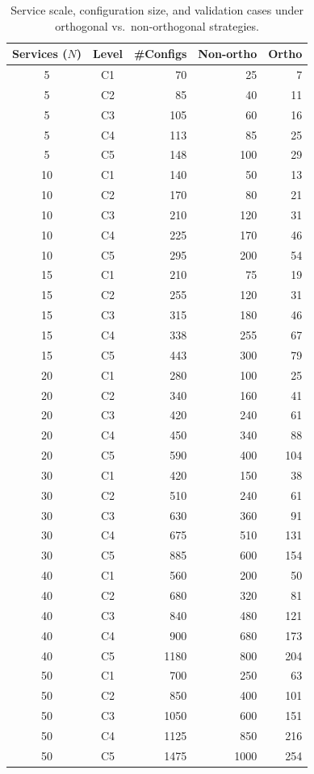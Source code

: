 \begin{table}[t]
\centering
\caption{Service scale, configuration size, and validation cases under orthogonal vs.\ non-orthogonal strategies.}
\label{tab:ortho-case-coverage}
\scriptsize
\setlength{\tabcolsep}{4pt}
\begin{tabular}{c c r r r}
\toprule
Services ($N$) & Level & \#Configs & Non-ortho & Ortho \\
\midrule
5 & C1 & 70 & 25 & 7 \\
5 & C2 & 85 & 40 & 11 \\
5 & C3 & 105 & 60 & 16 \\
5 & C4 & 113 & 85 & 25 \\
5 & C5 & 148 & 100 & 29 \\
\midrule
10 & C1 & 140 & 50 & 13 \\
10 & C2 & 170 & 80 & 21 \\
10 & C3 & 210 & 120 & 31 \\
10 & C4 & 225 & 170 & 46 \\
10 & C5 & 295 & 200 & 54 \\
\midrule
15 & C1 & 210 & 75 & 19 \\
15 & C2 & 255 & 120 & 31 \\
15 & C3 & 315 & 180 & 46 \\
15 & C4 & 338 & 255 & 67 \\
15 & C5 & 443 & 300 & 79 \\
\midrule
20 & C1 & 280 & 100 & 25 \\
20 & C2 & 340 & 160 & 41 \\
20 & C3 & 420 & 240 & 61 \\
20 & C4 & 450 & 340 & 88 \\
20 & C5 & 590 & 400 & 104 \\
\midrule
30 & C1 & 420 & 150 & 38 \\
30 & C2 & 510 & 240 & 61 \\
30 & C3 & 630 & 360 & 91 \\
30 & C4 & 675 & 510 & 131 \\
30 & C5 & 885 & 600 & 154 \\
\midrule
40 & C1 & 560 & 200 & 50 \\
40 & C2 & 680 & 320 & 81 \\
40 & C3 & 840 & 480 & 121 \\
40 & C4 & 900 & 680 & 173 \\
40 & C5 & 1180 & 800 & 204 \\
\midrule
50 & C1 & 700 & 250 & 63 \\
50 & C2 & 850 & 400 & 101 \\
50 & C3 & 1050 & 600 & 151 \\
50 & C4 & 1125 & 850 & 216 \\
50 & C5 & 1475 & 1000 & 254 \\
\bottomrule
\end{tabular}
\end{table}

